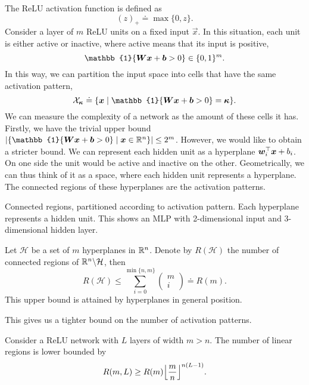 The ReLU activation function is defined as \[
    (z)_+ \doteq \max \{ 0,z \}.
\]
Consider a layer of $m$ ReLU units on a fixed input $\vec{x}$. In this situation, each unit is
either active or inactive, where active means that its input is positive, \[
    \mathbb{1}\{ \mat{W} \vec{x} + \vec{b} > 0 \} \in \{ 0,1 \}^m.
\]
In this way, we can partition the input space into cells that have the same activation pattern, \[
    \mathcal{X}_{\vec{\kappa}} \doteq \{ \vec{x} \mid \mathbb{1}\{ \mat{W} \vec{x} + \vec{b} > 0 \} = \vec{\kappa} \}.
\]
We can measure the complexity of a network as the amount of these cells it has. Firstly, we have
the trivial upper bound $|\{ \mathbb{1}\{ \mat{W} \vec{x} + \vec{b} > 0 \} \mid \vec{x} \in \R^n
    \}| \leq 2^m$. However, we would like to obtain a stricter bound. We can represent each hidden unit
as a hyperplane $\bm{w}_i^\top\bm{x} + b_i$. On one side the unit would be active and
inactive on the other. Geometrically, we can thus think of it as a space, where each hidden unit
represents a hyperplane. The connected regions of these hyperplanes are the activation patterns.

\begin{marginfigure}
    \centering
    \caption{Connected regions, partitioned according to activation pattern. Each hyperplane represents a hidden unit. This shows an MLP with 2-dimensional input and 3-dimensional hidden layer.}
    \label{fig:connected-regions}
\end{marginfigure}

\begin{theorem}
    Let $\mathcal{H}$ be a set of $m$ hyperplanes in $\mathbb{R}^n$. Denote by $R(\mathcal{H})$ the number of connected regions of $\mathbb{R}^n \backslash \mathcal{H}$, then \[
        R(\mathcal{H}) \leq \sum_{i=0}^{\min \{ n,m \}} \begin{pmatrix} m \\ i \end{pmatrix} \doteq R(m).
    \]
    This upper bound is attained by hyperplanes in general position.
\end{theorem}

This gives us a tighter bound on the number of activation patterns.

\begin{theorem}
    Consider a ReLU network with $L$ layers of width $m > n$. The number of linear regions is lower bounded by \[
        R(m, L) \geq R(m) \lft\lfloor\frac{m}{n}\rgt\rfloor^{n(L-1)}.
    \]
\end{theorem}

